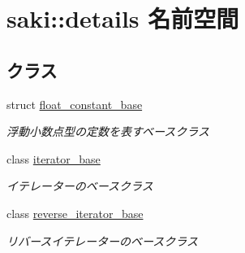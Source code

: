 \hypertarget{namespacesaki_1_1details}{}\section{saki\+:\+:details 名前空間}
\label{namespacesaki_1_1details}
\subsection*{クラス}
\begin{DoxyCompactItemize}
\item 
struct \mbox{\hyperlink{structsaki_1_1details_1_1float__constant__base}{float\+\_\+constant\+\_\+base}}
\begin{DoxyCompactList}\small\item\em 浮動小数点型の定数を表すベースクラス \end{DoxyCompactList}\item 
class \mbox{\hyperlink{classsaki_1_1details_1_1iterator__base}{iterator\+\_\+base}}
\begin{DoxyCompactList}\small\item\em イテレーターのベースクラス \end{DoxyCompactList}\item 
class \mbox{\hyperlink{classsaki_1_1details_1_1reverse__iterator__base}{reverse\+\_\+iterator\+\_\+base}}
\begin{DoxyCompactList}\small\item\em リバースイテレーターのベースクラス \end{DoxyCompactList}\end{DoxyCompactItemize}
